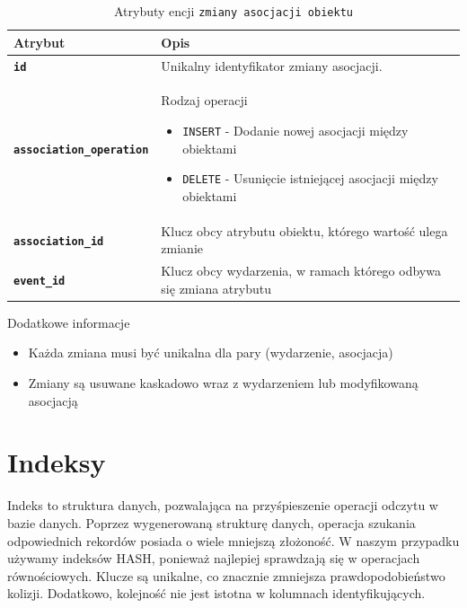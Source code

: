\begin{table}[H]
    \centering
    \renewcommand{\arraystretch}{1.6}
    \begin{tabular}{|>{\bfseries}l|p{}|}
        \hline
        \rowcolor[HTML]{EFEFEF} \textbf{Atrybut} & \textbf{Opis} \\
        \hline
        \texttt{id} & Unikalny identyfikator zmiany asocjacji. \\
        \hline
        \texttt{association\_operation} & Rodzaj operacji
        \begin{itemize}
            \item \texttt{INSERT} - Dodanie nowej asocjacji między obiektami
            \item \texttt{DELETE} - Usunięcie istniejącej asocjacji między obiektami
        \end{itemize} \\
        \hline
        \texttt{association\_id} & Klucz obcy atrybutu obiektu, którego wartość ulega zmianie \\
        \hline
        \texttt{event\_id} & Klucz obcy wydarzenia, w ramach którego odbywa się zmiana atrybutu \\
        \hline
    \end{tabular}
    \caption{Atrybuty encji \texttt{zmiany asocjacji obiektu}}
\end{table}

Dodatkowe informacje
\begin{itemize}
    \item Każda zmiana musi być unikalna dla pary (wydarzenie, asocjacja)
    \item Zmiany są usuwane kaskadowo wraz z wydarzeniem lub modyfikowaną asocjacją
\end{itemize}

\section{Indeksy}

Indeks to struktura danych, pozwalająca na przyśpieszenie operacji odczytu w bazie danych.
Poprzez wygenerowaną strukturę danych, operacja szukania odpowiednich rekordów posiada o wiele mniejszą złożoność.
W naszym przypadku używamy indeksów HASH, ponieważ najlepiej sprawdzają się w operacjach równościowych.
Klucze są unikalne, co znacznie zmniejsza prawdopodobieństwo kolizji. Dodatkowo, kolejność
nie jest istotna w kolumnach identyfikujących.

